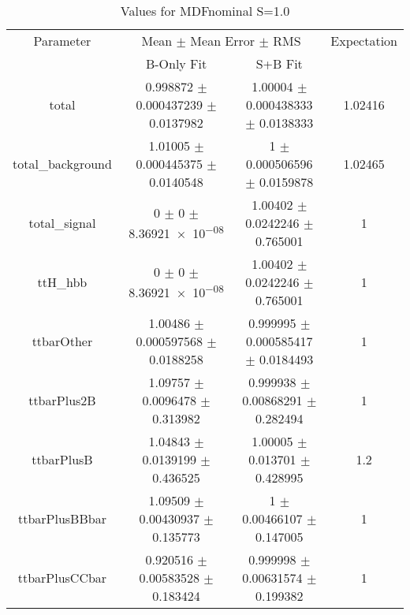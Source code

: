 \begin{table}
\centering
\caption{Values for MDFnominal S=1.0}
\begin{tabular}{cccc}
\toprule
Parameter & \multicolumn{2}{c}{Mean $\pm$ Mean Error $\pm$ RMS} & Expectation\\
 & B-Only Fit & S+B Fit & \\
\midrule
total & \num{0.998872} $\pm$ \num{0.000437239} $\pm$ \num{0.0137982} & \num{1.00004} $\pm$ \num{0.000438333} $\pm$ \num{0.0138333} & \num{1.02416}\\
total\_background & \num{1.01005} $\pm$ \num{0.000445375} $\pm$ \num{0.0140548} & \num{1} $\pm$ \num{0.000506596} $\pm$ \num{0.0159878} & \num{1.02465}\\
total\_signal & \num{0} $\pm$ \num{0} $\pm$ \num{8.36921e-08} & \num{1.00402} $\pm$ \num{0.0242246} $\pm$ \num{0.765001} & \num{1}\\
ttH\_hbb & \num{0} $\pm$ \num{0} $\pm$ \num{8.36921e-08} & \num{1.00402} $\pm$ \num{0.0242246} $\pm$ \num{0.765001} & \num{1}\\
ttbarOther & \num{1.00486} $\pm$ \num{0.000597568} $\pm$ \num{0.0188258} & \num{0.999995} $\pm$ \num{0.000585417} $\pm$ \num{0.0184493} & \num{1}\\
ttbarPlus2B & \num{1.09757} $\pm$ \num{0.0096478} $\pm$ \num{0.313982} & \num{0.999938} $\pm$ \num{0.00868291} $\pm$ \num{0.282494} & \num{1}\\
ttbarPlusB & \num{1.04843} $\pm$ \num{0.0139199} $\pm$ \num{0.436525} & \num{1.00005} $\pm$ \num{0.013701} $\pm$ \num{0.428995} & \num{1.2}\\
ttbarPlusBBbar & \num{1.09509} $\pm$ \num{0.00430937} $\pm$ \num{0.135773} & \num{1} $\pm$ \num{0.00466107} $\pm$ \num{0.147005} & \num{1}\\
ttbarPlusCCbar & \num{0.920516} $\pm$ \num{0.00583528} $\pm$ \num{0.183424} & \num{0.999998} $\pm$ \num{0.00631574} $\pm$ \num{0.199382} & \num{1}\\
\bottomrule
\end{tabular}
\end{table}